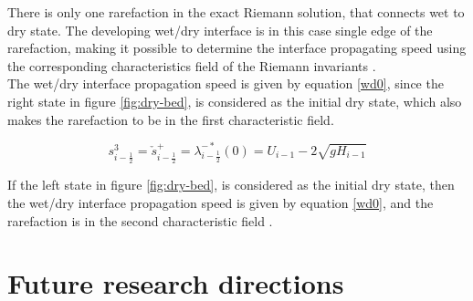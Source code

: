 \documentclass[12pt,a4paper]{article}
\begin{document}
	\noindent There is only one rarefaction in the exact Riemann solution, that connects wet to dry state. The developing wet/dry interface is in this case single edge of the rarefaction, making it possible to determine the interface propagating speed using the corresponding characteristics field of the Riemann invariants \cite{ge:2008}.\\ 
	
	\noindent The wet/dry interface propagation  speed  is given by equation \eqref{wd0}, since the right state in figure \ref{fig:dry-bed}, is considered as the initial dry state, which also makes the rarefaction to be in the first characteristic field.
	
	\begin{equation}
		s_{i-\frac{1}{2}}^{3} = \check{s}_{i-\frac{1}{2}}^{+} = \lambda_{i-\frac{1}{2}}^{-*}(0)= U_{i-1} - 2\sqrt{gH_{i-1}}
		\label{wd0}
	\end{equation}
	
	\noindent If the left state in figure \ref{fig:dry-bed}, is considered as the initial dry state, then the  wet/dry interface propagation  speed  is given by equation \eqref{wd0}, and the  rarefaction is in the second characteristic field .
	
\section{ Future research directions}
	
	
	
	
	
	
	
	
\end{document}
